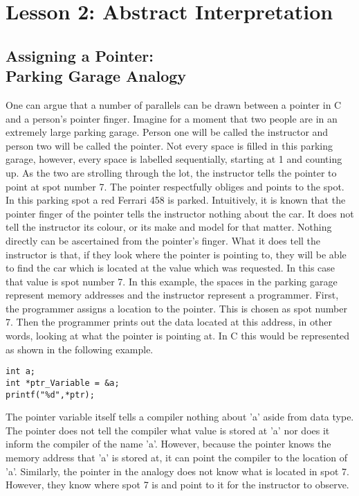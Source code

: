 \documentclass[two column, 10pt]{article}
\begin{document}
\section{Lesson 2: Abstract Interpretation}
\subsection{Assigning a Pointer: \\Parking Garage Analogy}
One can argue that a number of parallels can be drawn between a pointer in C and a person’s pointer finger. Imagine for a moment that two people are in an extremely large parking garage. Person one will be called the instructor and person two will be called the pointer. Not every space is filled in this parking garage, however, every space is labelled sequentially, starting at 1 and counting up. As the two are strolling through the lot, the instructor tells the pointer to point at spot number 7. The pointer respectfully obliges and points to the spot. In this parking spot a red Ferrari 458 is parked. Intuitively, it is known that the pointer finger of the pointer tells the instructor nothing about the car. It does not tell the instructor its colour, or its make and model for that matter. Nothing directly can be ascertained from the pointer’s finger. What it does tell the instructor is that, if they look where the pointer is pointing to, they will be able to find the car which is located at the value which was requested. In this case that value is spot number 7.
In this example, the spaces in the parking garage represent memory addresses and the instructor represent a programmer. First, the programmer assigns a location to the pointer. This is chosen as spot number 7. Then the programmer prints out the data located at this address, in other words, looking at what the pointer is pointing at. In C this would be represented as shown in the following example.
\begin{lstlisting}[style=CStyle,
caption={Assigning an Address to a Pointer Variable},captionpos=b]
int a;
int *ptr_Variable = &a;
printf("%d",*ptr);
\end{lstlisting}
The pointer variable itself tells a compiler nothing about 'a' aside from data type. The pointer does not tell the compiler what value is stored at 'a' nor does it inform the compiler of the name 'a'. However, because the pointer knows the memory address that 'a' is stored at, it can point the compiler to the location of 'a'. Similarly, the pointer in the analogy does not know what is located in spot 7. However, they know where spot 7 is and point to it for the instructor to observe.
\end{document}
